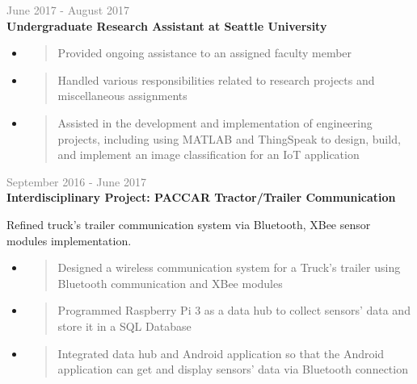\documentclass[letterpage]{article}
\begin{document}
\begin{minipage}[t]{0.61\linewidth}
\vspace{7px}
\textcolor{gray}{June 2017 - August 2017}
\quad 
\\
\textbf{\textsf{Undergraduate Research Assistant at Seattle University}}\\
\raggedright
\begin{itemize}[leftmargin=*,labelindent=1mm,labelsep=0mm]
\item
  \begin{quote}
  \raggedright
  Provided ongoing assistance to an assigned faculty member
  \end{quote}
\item
  \begin{quote}
  \raggedright
  Handled various responsibilities related to research projects
and miscellaneous assignments
  \end{quote}
\item 
  \begin{quote}
    \raggedright
    Assisted in the development and implementation of
    engineering projects, including using MATLAB and ThingSpeak to design, build, and implement an image classification for an IoT application
  \end{quote}
\end{itemize}

\vspace{7px}
\textcolor{gray}{September 2016 - June 2017}
\quad 
\\
\textbf{\textsf{Interdisciplinary Project:
PACCAR Tractor/Trailer Communication}}\\
\raggedright
Refined truck’s trailer communication system via Bluetooth, XBee sensor modules implementation.\\
\begin{itemize}[leftmargin=*,labelindent=1mm,labelsep=0mm]
\item
  \begin{quote}
  \raggedright
  Designed a wireless communication system for a Truck's trailer using Bluetooth communication and XBee modules
  \end{quote}
\item
  \begin{quote}
  \raggedright
  Programmed Raspberry Pi 3 as a data hub to collect sensors' data and store it in a SQL Database
  \end{quote}
\item
  \begin{quote}
  \raggedright
  Integrated data hub and Android application so that the Android application can get and display sensors' data via Bluetooth connection
  \end{quote}
\end{itemize}


\end{minipage}
\end{document}

